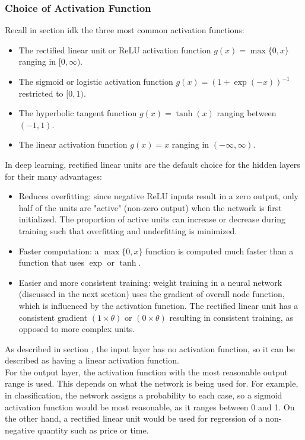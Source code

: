 \documentclass[a4paper,12pt]{article}
\numberwithin{equation}{section}
\begin{document}
\subsubsection{Choice of Activation Function}
Recall in section idk the three most common activation functions:
\begin{itemize}
\item The rectified linear unit or ReLU activation function $g(x)=\max\{0,x\}$ ranging in $[0,\infty)$.
\item The sigmoid or logistic activation function $g(x)=(1+\exp(-x))^{-1}$ restricted to $[0,1)$.
\item The hyperbolic tangent function $g(x)=\tanh(x)$ ranging between $(-1,1)$.
\item The linear activation function $g(x)=x$ ranging in $(-\infty, \infty)$.
\end{itemize}
In deep learning, rectified linear units are the default choice for the hidden layers for their many advantages:
\begin{itemize}
\item Reduces overfitting: since negative ReLU inputs result in a zero output, only half of the units are "active" (non-zero output) when the network is first initialized. The proportion of active units can increase or decrease during training such that overfitting and underfitting is minimized.
\item Faster computation: a $\max\{0,x\}$ function is computed much faster than a function that uses $\exp$ or $\tanh$.
\item Easier and more consistent training: weight training in a neural network (discussed in the next section) uses the gradient of overall node function, which is influenced by the activation function. The rectified linear unit has a consistent gradient $(1\times \theta)$ or $(0\times \theta)$ resulting in consistent training, as opposed to more complex units. 
\end{itemize}
As described in section , the input layer has no activation function, so it can be described as having a linear activation function.\\
For the output layer, the activation function with the most reasonable output range is used. This depends on what the network is being used for. For example, in classification, the network assigns a probability to each case, so a sigmoid activation function would be most reasonable, as it ranges between 0 and 1. On the other hand, a rectified linear unit would be used for regression of a non-negative quantity such as price or time.
\newpage
\end{document}

